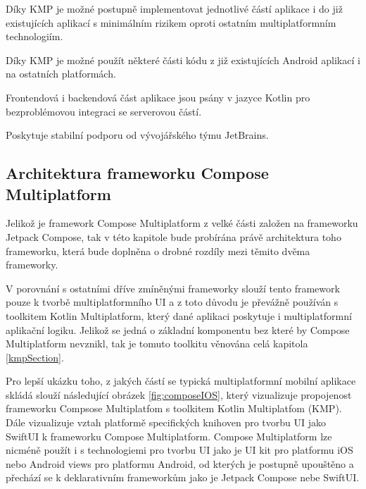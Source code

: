Díky KMP je možné postupně implementovat jednotlivé částí aplikace i do již existujících aplikací s minimálním rizikem oproti
ostatním multiplatformním technologiím. \cite{KMP}

Díky KMP je možné použít některé části kódu z již existujících Android aplikací i na ostatních platformách.

Frontendová i backendová část aplikace jsou psány v jazyce Kotlin pro bezproblémovou integraci se serverovou částí.

Poskytuje stabilní podporu od vývojářského týmu JetBrains.

\subsection*{Architektura frameworku Compose Multiplatform} \label{ComposeArch}
Jelikož je framework Compose Multiplatform z velké části založen na frameworku Jetpack Compose, tak v této kapitole bude probírána
právě architektura toho frameworku, která bude doplněna o drobné rozdíly mezi těmito dvěma frameworky.

V porovnání s ostatními dříve zmíněnými frameworky slouží tento framework pouze k tvorbě multiplatformního UI a z toto důvodu je převážně 
používán s toolkitem Kotlin Multiplatform, který dané aplikaci poskytuje i multiplatformní aplikační logiku. Jelikož se jedná o základní 
komponentu bez které by Compose Multiplatform nevznikl, tak je tomuto toolkitu věnována celá kapitola \ref{kmpSection}.

Pro lepší ukázku toho, z jakých částí se typická multiplatformní mobilní aplikace skládá slouží následující obrázek \ref{fig:composeIOS}, který
vizualizuje propojenost frameworku Compsose Multiplatfom s toolkitem Kotlin Multiplatfom (KMP). Dále vizualizuje 
vztah platformě specifických knihoven pro tvorbu UI jako SwiftUI k frameworku Compose Multiplatform.
Compose Multiplatform lze nicméně použít i s technologiemi pro tvorbu UI jako je UI kit pro platformu iOS nebo
Android views  pro platformu Android, od kterých je postupně upouštěno a přechází se k deklarativním frameworkům jako je Jetpack Compose nebe SwiftUI.  

